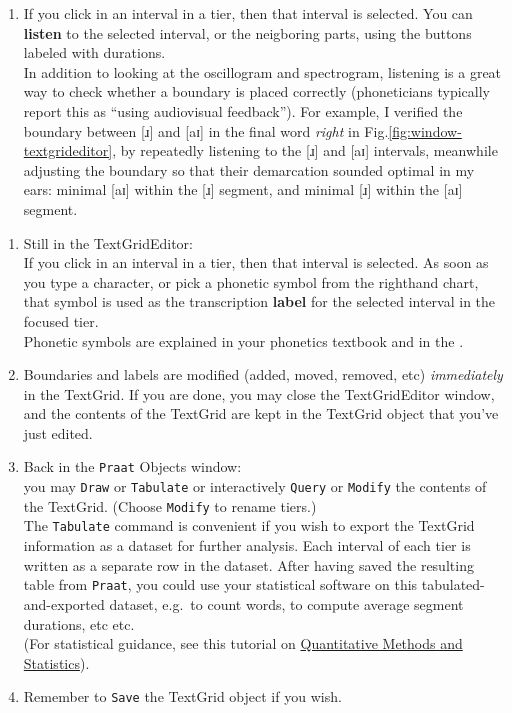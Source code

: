 \documentclass[
]{book}
\begin{document}
\begin{enumerate}
  If you are not happy with a boundary, you can \textbf{remove} it by first selecting the boundary (click on it), then choose \texttt{Boundary\ \textgreater{}\ Remove}.\\
\item
  If you click in an interval in a tier, then that interval is selected. You can \textbf{listen} to the selected interval, or the neigboring parts, using the buttons labeled with durations.\\
  In addition to looking at the oscillogram and spectrogram, listening is a great way to check whether a boundary is placed correctly (phoneticians typically report this as ``using audiovisual feedback''). For example, I verified the boundary between {[}ɹ{]} and {[}aɪ{]} in the final word \emph{right} in Fig.\ref{fig:window-textgrideditor}, by repeatedly listening to the {[}ɹ{]} and {[}aɪ{]} intervals, meanwhile adjusting the boundary so that their demarcation sounded optimal in my ears: minimal {[}aɪ{]} within the {[}ɹ{]} segment, and minimal {[}ɹ{]} within the {[}aɪ{]} segment.
\end{enumerate}

\begin{enumerate}
\def\labelenumi{(\arabic{enumi})}
\setcounter{enumi}{5}
\item
  Still in the TextGridEditor:\\
  If you click in an interval in a tier, then that interval is selected. As soon as you type a character, or pick a phonetic symbol from the righthand chart, that symbol is used as the transcription \textbf{label} for the selected interval in the focused tier.\\
  Phonetic symbols are explained in your phonetics textbook and in the \citet{HandbookIPA_1999}.
\item
  Boundaries and labels are modified (added, moved, removed, etc) \emph{immediately} in the TextGrid. If you are done, you may close the TextGridEditor window, and the contents of the TextGrid are kept in the TextGrid object that you've just edited.
\item
  Back in the \texttt{Praat} Objects window:\\
  you may \texttt{Draw} or \texttt{Tabulate} or interactively \texttt{Query} or \texttt{Modify} the contents of the TextGrid. (Choose \texttt{Modify} to rename tiers.)\\
  The \texttt{Tabulate} command is convenient if you wish to export the TextGrid information as a dataset for further analysis. Each interval of each tier is written as a separate row in the dataset. After having saved the resulting table from \texttt{Praat}, you could use your statistical software on this tabulated-and-exported dataset, e.g.~to count words, to compute average segment durations, etc etc.\\
  (For statistical guidance, see this tutorial on \href{https://hugoquene.github.io/QMS-EN/}{Quantitative Methods and Statistics}).
\item
  Remember to \texttt{Save} the TextGrid object if you wish.
\end{enumerate}
\end{document}
